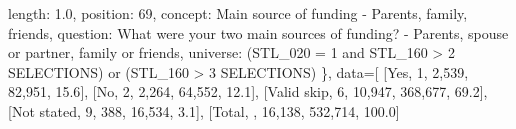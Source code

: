 \documentclass[
  11pt,
  a4paper,
]{article}
\newenvironment{Shaded}{\begin{snugshade}}{\end{snugshade}}
\newcommand{\NormalTok}[1]{\textcolor[rgb]{0.00,0.23,0.31}{#1}}
\newcommand{\OperatorTok}[1]{\textcolor[rgb]{0.37,0.37,0.37}{#1}}
\newcommand{\StringTok}[1]{\textcolor[rgb]{0.13,0.47,0.30}{#1}}
\begin{document}
\begin{Shaded}
\begin{Highlighting}[]
                    \StringTok{\textquotesingle{}length\textquotesingle{}}\NormalTok{: }\StringTok{\textquotesingle{}1.0\textquotesingle{}}\NormalTok{, }\StringTok{\textquotesingle{}position\textquotesingle{}}\NormalTok{: }\StringTok{\textquotesingle{}69\textquotesingle{}}\NormalTok{,}
                    \StringTok{\textquotesingle{}concept\textquotesingle{}}\NormalTok{: }\StringTok{\textquotesingle{}Main source of funding {-} Parents, family, friends\textquotesingle{}}\NormalTok{,}
                    \StringTok{\textquotesingle{}question\textquotesingle{}}\NormalTok{: }\StringTok{\textquotesingle{}What were your two main sources of funding? {-} Parents, spouse or partner, family or friends\textquotesingle{}}\NormalTok{,}
                    \StringTok{\textquotesingle{}universe\textquotesingle{}}\NormalTok{: }\StringTok{\textquotesingle{}(STL\_020 = 1 and STL\_160 \textgreater{} 2 SELECTIONS) or (STL\_160 \textgreater{} 3 SELECTIONS)\textquotesingle{}}
\NormalTok{                \},}
\NormalTok{                data}\OperatorTok{=}\NormalTok{[}
\NormalTok{                    [}\StringTok{\textquotesingle{}Yes\textquotesingle{}}\NormalTok{, }\StringTok{\textquotesingle{}1\textquotesingle{}}\NormalTok{, }\StringTok{\textquotesingle{}2,539\textquotesingle{}}\NormalTok{, }\StringTok{\textquotesingle{}82,951\textquotesingle{}}\NormalTok{, }\StringTok{\textquotesingle{}15.6\textquotesingle{}}\NormalTok{],}
\NormalTok{                    [}\StringTok{\textquotesingle{}No\textquotesingle{}}\NormalTok{, }\StringTok{\textquotesingle{}2\textquotesingle{}}\NormalTok{, }\StringTok{\textquotesingle{}2,264\textquotesingle{}}\NormalTok{, }\StringTok{\textquotesingle{}64,552\textquotesingle{}}\NormalTok{, }\StringTok{\textquotesingle{}12.1\textquotesingle{}}\NormalTok{],}
\NormalTok{                    [}\StringTok{\textquotesingle{}Valid skip\textquotesingle{}}\NormalTok{, }\StringTok{\textquotesingle{}6\textquotesingle{}}\NormalTok{, }\StringTok{\textquotesingle{}10,947\textquotesingle{}}\NormalTok{, }\StringTok{\textquotesingle{}368,677\textquotesingle{}}\NormalTok{, }\StringTok{\textquotesingle{}69.2\textquotesingle{}}\NormalTok{],}
\NormalTok{                    [}\StringTok{\textquotesingle{}Not stated\textquotesingle{}}\NormalTok{, }\StringTok{\textquotesingle{}9\textquotesingle{}}\NormalTok{, }\StringTok{\textquotesingle{}388\textquotesingle{}}\NormalTok{, }\StringTok{\textquotesingle{}16,534\textquotesingle{}}\NormalTok{, }\StringTok{\textquotesingle{}3.1\textquotesingle{}}\NormalTok{],}
\NormalTok{                    [}\StringTok{\textquotesingle{}Total\textquotesingle{}}\NormalTok{, }\StringTok{\textquotesingle{}\textquotesingle{}}\NormalTok{, }\StringTok{\textquotesingle{}16,138\textquotesingle{}}\NormalTok{, }\StringTok{\textquotesingle{}532,714\textquotesingle{}}\NormalTok{, }\StringTok{\textquotesingle{}100.0\textquotesingle{}}\NormalTok{]}

\end{Highlighting}
\end{Shaded}
\end{document}

